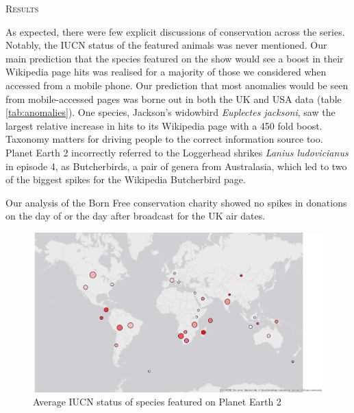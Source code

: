 \documentclass[12pt,letterpaper]{article}
\renewcommand{\section}[1]{%
\bigskip
\begin{center}
\begin{Large}
\normalfont\scshape #1
\medskip
\end{Large}
\end{center}}
\begin{document}
\section{Results}
 As expected, there were few explicit discussions of conservation across the series. Notably, the IUCN status of the featured animals was never mentioned. Our main prediction that the species featured on the show would see a boost in their Wikipedia page hits was realised for a majority of those we considered when accessed from a mobile phone. Our prediction that most anomalies would be seen from mobile-accessed pages was borne out in both the UK and USA data (table \ref{tab:anomalies}). One species, Jackson's widowbird \textit {Euplectes jacksoni}, saw the largest relative increase in hits to its Wikipedia page with a 450 fold boost. Taxonomy matters for driving people to the correct information source too. Planet Earth 2 incorrectly referred to the Loggerhead shrikes \textit {Lanius ludovicianus} in episode 4, as Butcherbirds, a pair of genera from Australasia, which led to two of the biggest spikes for the Wikipedia Butcherbird page.  

 Our analysis of the Born Free conservation charity showed no spikes in donations on the day of or the day after broadcast for the UK air dates. 

\begin{figure}[H]
\centering
    \includegraphics[keepaspectratio, totalheight=0.5 \textheight]{map2.jpg}
\caption{Average IUCN status of species featured on Planet Earth 2}
\label{info.diff}
\end{figure}
\end{document}
